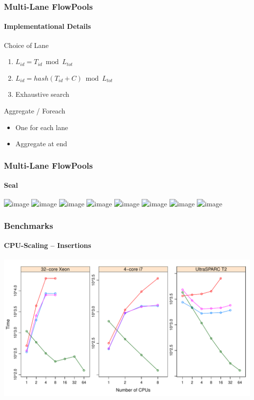 \documentclass{beamer}
\begin{document}
\begin{frame}
  \frametitle{Multi-Lane FlowPools}
  \framesubtitle{Implementational Details}

  \begin{block}{Choice of Lane}
    \begin{enumerate}
    \item $L_{id} = T_{id} \bmod L_{tot}$
    \item $L_{id} = hash(T_{id} + C) \bmod L_{tot}$
    \item Exhaustive search
    \end{enumerate}
  \end{block}

  \begin{block}{Aggregate / Foreach}
    \begin{itemize}
    \item One for each lane
    \item Aggregate at end
    \end{itemize}
  \end{block}

\end{frame}

\begin{frame}
  \frametitle{Multi-Lane FlowPools}
  \framesubtitle{Seal}

  \includegraphics<1>[page=1]{figs/MLFP_seal}
  \includegraphics<2>[page=2]{figs/MLFP_seal}
  \includegraphics<3>[page=3]{figs/MLFP_seal}
  \includegraphics<4>[page=4]{figs/MLFP_seal}
  \includegraphics<5>[page=5]{figs/MLFP_seal}
  \includegraphics<6>[page=6]{figs/MLFP_seal}
  \includegraphics<7>[page=7]{figs/MLFP_seal}
  \includegraphics<8>[page=8]{figs/MLFP_seal}

\end{frame}

\begin{frame}
  \frametitle{Benchmarks}
  \framesubtitle{CPU-Scaling -- Insertions}
  \includegraphics[width=\textwidth]{../../benchmarks/pres_graphs/cpu-scaling-insert}

\end{frame}
\end{document}
